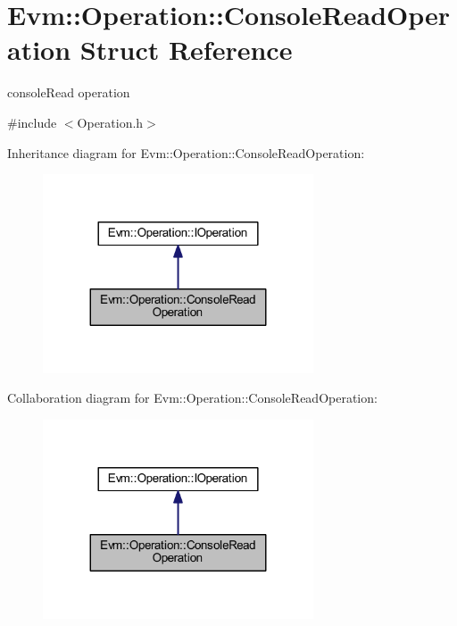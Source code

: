 \hypertarget{struct_evm_1_1_operation_1_1_console_read_operation}{}\section{Evm\+:\+:Operation\+:\+:Console\+Read\+Operation Struct Reference}
\label{struct_evm_1_1_operation_1_1_console_read_operation}


console\+Read operation  




{\ttfamily \#include $<$Operation.\+h$>$}



Inheritance diagram for Evm\+:\+:Operation\+:\+:Console\+Read\+Operation\+:
\nopagebreak
\begin{figure}[H]
\begin{center}
\leavevmode
\includegraphics[width=227pt]{struct_evm_1_1_operation_1_1_console_read_operation__inherit__graph}
\end{center}
\end{figure}


Collaboration diagram for Evm\+:\+:Operation\+:\+:Console\+Read\+Operation\+:
\nopagebreak
\begin{figure}[H]
\begin{center}
\leavevmode
\includegraphics[width=227pt]{struct_evm_1_1_operation_1_1_console_read_operation__coll__graph}
\end{center}
\end{figure}
